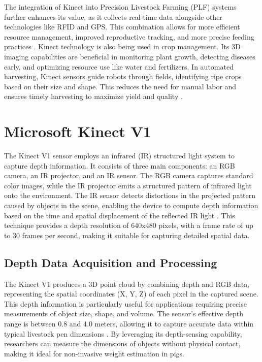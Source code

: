 {The integration of Kinect into Precision Livestock Farming (PLF) systems further enhances its value, as it collects real-time data alongside other technologies like RFID and GPS. This combination allows for more efficient resource management, improved reproductive tracking, and more precise feeding practices \citep{monteiro2021precision}. Kinect technology is also being used in crop management. Its 3D imaging capabilities are beneficial in monitoring plant growth, detecting diseases early, and optimizing resource use like water and fertilizers. In automated harvesting, Kinect sensors guide robots through fields, identifying ripe crops based on their size and shape. This reduces the need for manual labor and ensures timely harvesting to maximize yield and quality \citep{singh2022smart}.

\section{Microsoft Kinect V1}

The Kinect V1 sensor employs an infrared (IR) structured light system to capture depth information. It consists of three main components: an RGB camera, an IR projector, and an IR sensor. The RGB camera captures standard color images, while the IR projector emits a structured pattern of infrared light onto the environment. The IR sensor detects distortions in the projected pattern caused by objects in the scene, enabling the device to compute depth information based on the time and spatial displacement of the reflected IR light \citep{Zhang2012}. This technique provides a depth resolution of 640x480 pixels, with a frame rate of up to 30 frames per second, making it suitable for capturing detailed spatial data.

\subsection{Depth Data Acquisition and Processing}

The Kinect V1 produces a 3D point cloud by combining depth and RGB data, representing the spatial coordinates (X, Y, Z) of each pixel in the captured scene. This depth information is particularly useful for applications requiring precise measurements of object size, shape, and volume. The sensor's effective depth range is between 0.8 and 4.0 meters, allowing it to capture accurate data within typical livestock pen dimensions \citep{Smisek2013}. By leveraging its depth-sensing capability, researchers can measure the dimensions of objects without physical contact, making it ideal for non-invasive weight estimation in pigs.

}
